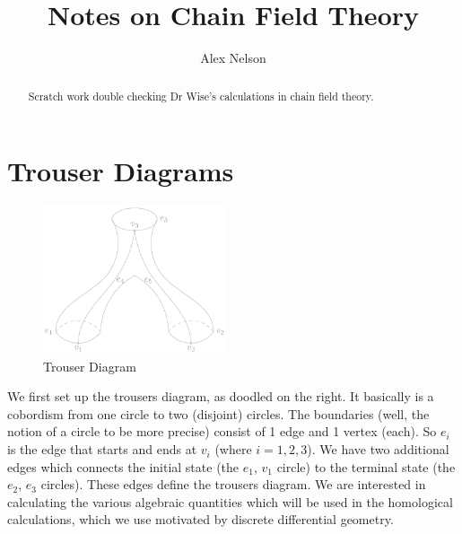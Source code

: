 \documentclass{amsart}
\title{Notes on Chain Field Theory}
\author{Alex Nelson}
\numberwithin{equation}{section}
\begin{document}
\maketitle
\begin{abstract}
Scratch work double checking Dr Wise's calculations in chain
field theory.
\end{abstract}

\section{Trouser Diagrams}

\begin{figure}
  \begin{center}
    \includegraphics[width=0.48\textwidth]{img/img0.eps}
  \end{center}
  \caption{\footnotesize {Trouser Diagram}}
\end{figure}
We first set up the trousers diagram, as doodled on the right. It
basically is a cobordism from one circle to two (disjoint)
circles. The boundaries (well, the notion of a circle to be more
precise) consist of 1 edge and 1 vertex (each). So $e_{i}$ is the
edge that starts and ends at $v_{i}$ (where $i=1,2,3$). We have
two additional edges which connects the initial state (the
$e_{1}$, $v_{1}$ circle) to the terminal state (the $e_{2}$,
$e_{3}$ circles). These edges define the trousers diagram. We are
interested in calculating the various algebraic quantities which
will be used in the homological calculations, which we use
motivated by discrete differential geometry.
\end{document}
